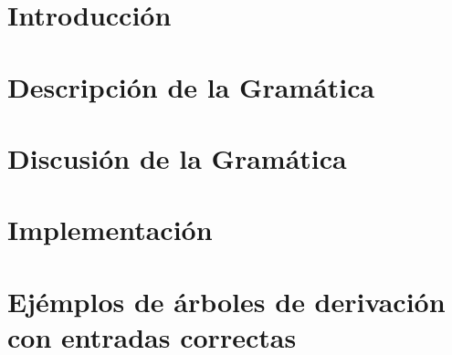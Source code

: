 \documentclass[10pt, a4paper]{article}
\begin{document}
	\maketitle
	\tableofcontents
	
	\newpage
	\section{Introducci\'on}
	
	
	\section{Descripción de la Gramática}
	
	
	\newpage
	\section{Discusión de la Gramática}
	
	
	\newpage
	\section{Implementaci\'on}
	
	
	\newpage
	\section{Ej\'emplos de \'arboles de derivaci\'on con entradas correctas}
	
	
\end{document}
